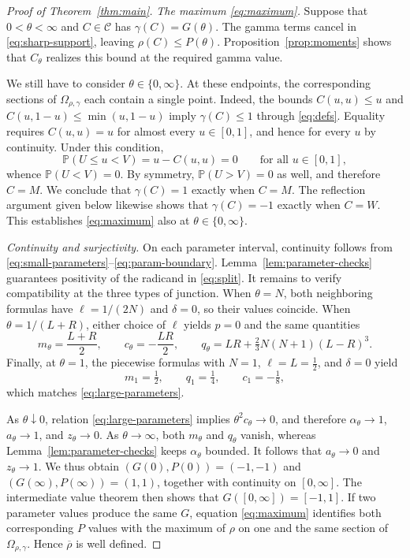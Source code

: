 \documentclass{article}
\theoremstyle{definition}
\theoremstyle{remark}
\newcommand{\1}{\mathds{1}}
\newcommand{\PP}{\mathbb{P}}
\newcommand{\CC}{\mathcal{C}}
\newcommand{\I}{[0,1]}
\newcommand{\Om}{\Omega_{\rho,\gamma}}
\newcommand{\rhoup}{\overline{\rho}}
\begin{document}
\begin{proof}[Proof of Theorem~\ref{thm:main}]
	\emph{The maximum \eqref{eq:maximum}.}
	Suppose that $0<\theta<\infty$ and $C\in\CC$ has $\gamma(C)=G(\theta)$.
	The gamma terms cancel in \eqref{eq:sharp-support}, leaving $\rho(C)\le P(\theta)$. Proposition~\ref{prop:moments} shows that $C_\theta$ realizes this bound at the required gamma value.

	We still have to consider $\theta\in\{0,\infty\}$. At these endpoints, the corresponding sections of $\Om$ each contain a single point.
	Indeed, the bounds $C(u,u)\le u$ and $C(u,1-u)\le\min(u,1-u)$ imply $\gamma(C)\le1$ through \eqref{eq:defs}. Equality requires $C(u,u)=u$ for almost every $u\in\I$, and hence for every $u$ by continuity.
	Under this condition,
	\[
		\PP(U\le u<V)=u-C(u,u)=0\qquad\text{for all }u\in\I,
	\]
	whence $\PP(U<V)=0$. By symmetry, $\PP(U>V)=0$ as well, and therefore $C=M$.
	We conclude that $\gamma(C)=1$ exactly when $C=M$. The reflection argument given below likewise shows that $\gamma(C)=-1$ exactly when $C=W$.
	This establishes \eqref{eq:maximum} also at $\theta\in\{0,\infty\}$.

	\emph{Continuity and surjectivity.}
	On each parameter interval, continuity follows from \eqref{eq:small-parameters}--\eqref{eq:param-boundary}. Lemma~\ref{lem:parameter-checks} guarantees positivity of the radicand in \eqref{eq:split}.
	It remains to verify compatibility at the three types of junction.
	When $\theta=N$, both neighboring formulas have $\ell=1/(2N)$ and $\delta=0$, so their values coincide.
	When $\theta=1/(L+R)$, either choice of $\ell$ yields $p=0$ and the same quantities
	\[
		m_\theta=\frac{L+R}{2},\qquad c_\theta=-\frac{LR}{2},\qquad q_\theta=LR+\tfrac23N(N+1)(L-R)^3.
	\]
	Finally, at $\theta=1$, the piecewise formulas with $N=1$, $\ell=L=\tfrac12$, and $\delta=0$ yield
	\[
		m_1=\tfrac12,\qquad q_1=\tfrac14,\qquad c_1=-\tfrac18,
	\]
	which matches \eqref{eq:large-parameters}.

	As $\theta\downarrow0$, relation \eqref{eq:large-parameters} implies $\theta^2c_\theta\to0$, and therefore $\alpha_\theta\to1$, $a_\theta\to1$, and $z_\theta\to0$.
	As $\theta\to\infty$, both $m_\theta$ and $q_\theta$ vanish, whereas Lemma~\ref{lem:parameter-checks} keeps $\alpha_\theta$ bounded. It follows that $a_\theta\to0$ and $z_\theta\to1$.
	We thus obtain $(G(0),P(0))=(-1,-1)$ and $(G(\infty),P(\infty))=(1,1)$, together with continuity on $[0,\infty]$.
	The intermediate value theorem then shows that $G([0,\infty])=[-1,1]$.
	If two parameter values produce the same $G$, equation \eqref{eq:maximum} identifies both corresponding $P$ values with the maximum of $\rho$ on one and the same section of $\Om$. Hence $\rhoup$ is well defined.


\end{proof}
\end{document}
